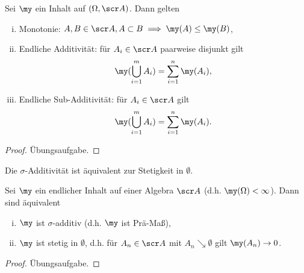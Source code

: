 \begin{nt} \label{1.3.7}
	Sei $\my$ ein Inhalt auf $(\Omega, \scr A)$.
	Dann gelten
	\begin{enumerate}[(i)]
		\item
			Monotonie: $A,B \in \scr A, A \subset B \implies \my(A) \le \my(B)$,
		\item
			Endliche Additivität: für $A_i \in \scr A$ paarweise disjunkt gilt
			\[
				\my(\bigcup_{i=1}^m A_i)
				= \sum_{i=1}^n \my(A_i),
			\]
		\item
			Endliche Sub-Additivität: für $A_i \in \scr A$ gilt
			\[
				\my(\bigcup_{i=1}^m A_i)
				= \sum_{i=1}^n \my(A_i).
			\]
	\end{enumerate}
	\begin{proof}
		Übungsaufgabe.
	\end{proof}
\end{nt}

Die $\sigma$-Additivität ist äquivalent zur Stetigkeit in $\emptyset$.

\begin{lem} \label{1.3.8}
	Sei $\my$ ein endlicher Inhalt auf einer Algebra $\scr A$ (d.h. $\my(\Omega) < \infty$).
	Dann sind äquivalent
	\begin{enumerate}[(i)]
		\item
			$\my$ ist $\sigma$-additiv (d.h. $\my$ ist Prä-Maß),
		\item
			$\my$ ist stetig in $\emptyset$, d.h. für $A_n \in \scr A$ mit $A_n \searrow \emptyset$ gilt $\my(A_n) \to 0$.
	\end{enumerate}
	\begin{proof}
		Übungsaufgabe.
	\end{proof}
\end{lem}


